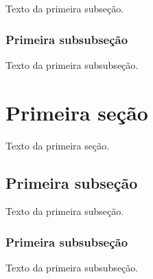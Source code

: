 \documentclass[a4paper,12pt,oneside,onecolumn,final,fleqn]{config/repUERJ}
\begin{document}
Texto da primeira subseção.

\subsubsection{Primeira subsubseção}

Texto da primeira subsubseção.
\section{Primeira seção}

Texto da primeira seção.

\subsection{Primeira subseção}

Texto da primeira subseção.

\subsubsection{Primeira subsubseção}

Texto da primeira subsubseção.
\printindex
\end{document}
